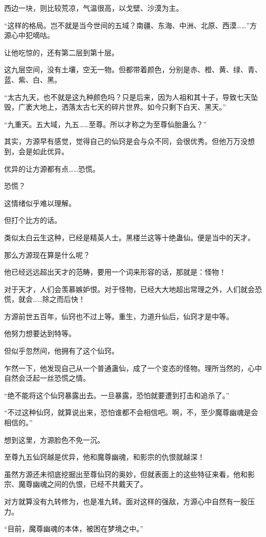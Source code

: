 \begin{this_body}
西边一块，则比较荒凉，气温很高，以戈壁、沙漠为主。

“这样的格局。岂不就是当今世间的五域？南疆、东海、中洲、北原、西漠……”方源心中犯嘀咕。

让他吃惊的，还有第二层到第十层。

这九层空间，没有土壤，空无一物。但都带着颜色，分别是赤、橙、黄、绿、青、蓝、紫、白、黑。

“太古九天，也不就是这九种颜色吗？只是后来，因为人祖和其十子，导致七天坠毁，广袤大地上，洒落太古七天的碎片世界。如今只剩下白天、黑天。”

“九重天。五大域，九五……至尊。所以才称之为至尊仙胎蛊么？”

其实，方源早有感觉，觉得自己的仙窍是会与众不同，会很优秀。但他万万没想到，会是如此优异。

优异的让方源都有点……恐慌。

恐慌？

这情绪似乎难以理解。

但打个比方的话。

类似太白云生这种，已经是精英人士。黑楼兰这等十绝蛊仙。便是当中的天才。

那么方源现在算是什么呢？

他已经远远超出天才的范畴，要用一个词来形容的话，那就是：怪物！

对于天才，人们会羡慕嫉妒恨。对于怪物，已经大大地超出常理之外，人们就会恐慌，就会……除之而后快！

方源前世五百年，仙窍也不过上等。重生，力道升仙后，仙窍才是中等。

他努力想要达到特等。

但似乎忽然间，他拥有了这个仙窍。

乍然一下，他发现自己从一个普通蛊仙，成了一个变态的怪物。理所当然的，心中自然会泛起一丝恐慌之情。

“绝不能将这个仙窍暴露出去。一旦暴露，恐怕就要遭到打击和追杀了。”

“不过这种仙窍，就算说出来，恐怕谁都不会相信吧。啊，不，至少魔尊幽魂是会相信的。”

想到这里，方源脸色不免一沉。

至尊九五仙窍越是优异，他和魔尊幽魂，和影宗的仇恨就越深！

虽然方源还未彻底挖掘出至尊仙窍的奥妙，但就表面上的这些特征来看，他和影宗、魔尊幽魂之间的仇恨，已经不共戴天了。

对方就算没有九转修为，也是准九转。面对这样的强敌，方源心中自然有一股压力。

“目前，魔尊幽魂的本体，被困在梦境之中。”


\end{this_body}
